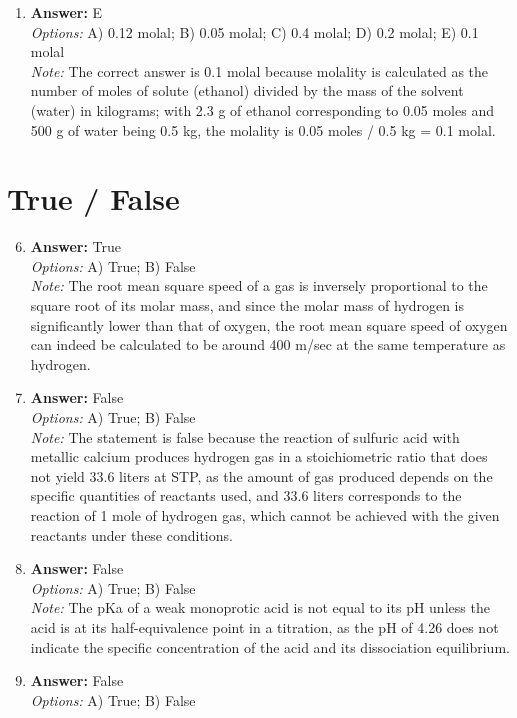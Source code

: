 \documentclass[12pt]{article}
\begin{document}
\begin{enumerate}[label=\arabic*.]
\item \textbf{Answer:} E
\\ \textit{Options:} A) 0.12 molal; B) 0.05 molal; C) 0.4 molal; D) 0.2 molal; E) 0.1 molal
\\ \textit{Note:} The correct answer is 0.1 molal because molality is calculated as the number of moles of solute (ethanol) divided by the mass of the solvent (water) in kilograms; with 2.3 g of ethanol corresponding to 0.05 moles and 500 g of water being 0.5 kg, the molality is 0.05 moles / 0.5 kg = 0.1 molal.
\end{enumerate}

\section*{True / False}
\begin{enumerate}[label=\arabic*.]
\setcounter{enumi}{5}
\item \textbf{Answer:} True
\\ \textit{Options:} A) True; B) False
\\ \textit{Note:} The root mean square speed of a gas is inversely proportional to the square root of its molar mass, and since the molar mass of hydrogen is significantly lower than that of oxygen, the root mean square speed of oxygen can indeed be calculated to be around 400 m/sec at the same temperature as hydrogen.
\item \textbf{Answer:} False
\\ \textit{Options:} A) True; B) False
\\ \textit{Note:} The statement is false because the reaction of sulfuric acid with metallic calcium produces hydrogen gas in a stoichiometric ratio that does not yield 33.6 liters at STP, as the amount of gas produced depends on the specific quantities of reactants used, and 33.6 liters corresponds to the reaction of 1 mole of hydrogen gas, which cannot be achieved with the given reactants under these conditions.
\item \textbf{Answer:} False
\\ \textit{Options:} A) True; B) False
\\ \textit{Note:} The pKa of a weak monoprotic acid is not equal to its pH unless the acid is at its half-equivalence point in a titration, as the pH of 4.26 does not indicate the specific concentration of the acid and its dissociation equilibrium.
\item \textbf{Answer:} False
\\ \textit{Options:} A) True; B) False

\end{enumerate}
\end{document}
